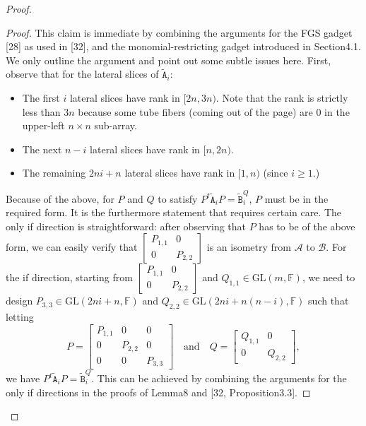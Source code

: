 \begin{proof}
\begin{proof}
This claim is immediate by combining the arguments for the FGS gadget [28] as used in [32], and the monomial-restricting gadget introduced in Section4.1. We only outline the argument and point out some subtle issues here.
First, observe that for the lateral slices of $\widetilde{\mathtt A}_i$:
\begin{itemize}
\item The first $i$ lateral slices have rank in $[2n,3n)$. Note that the rank is strictly less than $3n$ because some tube fibers (coming out of the page) are 0 in the upper-left $n\times n$ sub-array.
\item The next $n-i$ lateral slices have rank in $[n,2n)$.
\item The remaining $2ni+n$ lateral slices have rank in $[1,n)$ (since $i\ge1$.)
\end{itemize}
Because of the above, for $P$ and $Q$ to satisfy $P^t\widetilde{\mathtt A}_iP=\widetilde{\mathtt B}_i^Q$, $P$ must be in the required form.
It is the furthermore statement that requires certain care. The only if direction is straightforward: after observing that $P$ has to be of the above form, we can easily verify that $\begin{bmatrix}P_{1,1}&0\\0&P_{2,2}\end{bmatrix}$ is an isometry from $\mathcal A$ to $\mathcal B$. For the if direction, starting from $\begin{bmatrix}P_{1,1}&0\\0&P_{2,2}\end{bmatrix}$ and $Q_{1,1}\in\mathrm{GL}(m,\mathbb F)$, we need to design $P_{3,3}\in\mathrm{GL}(2ni+n,\mathbb F)$ and $Q_{2,2}\in\mathrm{GL}(2ni+n(n-i),\mathbb F)$ such that letting
\[P=\begin{bmatrix}P_{1,1}&0&0\\0&P_{2,2}&0\\0&0&P_{3,3}\end{bmatrix}\quad\text{and}\quad Q=\begin{bmatrix}Q_{1,1}&0\\0&Q_{2,2}\end{bmatrix},\]
we have $P^t\widetilde{\mathtt A}_iP=\widetilde{\mathtt B}_i^Q$. This can be achieved by combining the arguments for the only if directions in the proofs of Lemma8 and [32, Proposition3.3].
\end{proof}

\end{proof}
